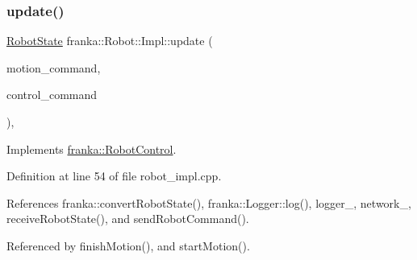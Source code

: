 \subsubsection{\texorpdfstring{update()}{update()}}
{\footnotesize\ttfamily \hyperlink{structfranka_1_1RobotState}{Robot\+State} franka\+::\+Robot\+::\+Impl\+::update (\begin{DoxyParamCaption}\item[{const \hyperlink{structresearch__interface_1_1robot_1_1MotionGeneratorCommand}{research\+\_\+interface\+::robot\+::\+Motion\+Generator\+Command} $\ast$}]{motion\+\_\+command,  }\item[{const \hyperlink{structresearch__interface_1_1robot_1_1ControllerCommand}{research\+\_\+interface\+::robot\+::\+Controller\+Command} $\ast$}]{control\+\_\+command }\end{DoxyParamCaption})\hspace{0.3cm}{\ttfamily [override]}, {\ttfamily [virtual]}}



Implements \hyperlink{classfranka_1_1RobotControl_a5b581e84547a76ad1600158345cfd40d}{franka\+::\+Robot\+Control}.



Definition at line 54 of file robot\+\_\+impl.\+cpp.



References franka\+::convert\+Robot\+State(), franka\+::\+Logger\+::log(), logger\+\_\+, network\+\_\+, receive\+Robot\+State(), and send\+Robot\+Command().



Referenced by finish\+Motion(), and start\+Motion().


